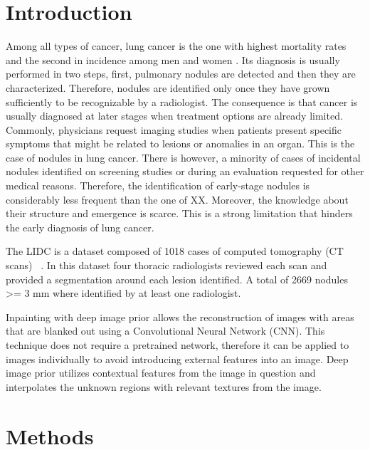 \documentclass[runningheads]{llncs}
\begin{document}
\section{Introduction}

Among all types of cancer, lung cancer is the one with highest mortality rates and the second in incidence among men and women \cite{doi:10.3322/caac.21551}. Its diagnosis is usually performed in two steps, first, pulmonary nodules are detected and then they are characterized. Therefore, nodules are identified only once they have grown sufficiently to be recognizable by a radiologist. The consequence is that cancer is usually diagnosed at later stages when treatment options are already limited.
Commonly, physicians request imaging studies when patients present specific symptoms that might be related to lesions or anomalies in an organ. This is the case of nodules in lung cancer. There is however, a minority of cases of incidental nodules identified on screening studies or during an evaluation requested for other medical reasons. Therefore, the identification of early-stage nodules is considerably less frequent than the one of XX. Moreover, the knowledge about their structure and emergence is scarce. This is a strong limitation that hinders the early diagnosis of lung cancer.

The LIDC is a dataset composed of 1018 cases of computed tomography (CT scans) ~\cite{pmid21452728}. In this dataset four thoracic radiologists reviewed each scan and provided a segmentation around each lesion identified. A total of 2669 nodules >= 3 mm where identified by at least one radiologist. 

Inpainting with deep image prior allows the reconstruction of images with areas that are blanked out using a Convolutional Neural Network (CNN). This technique does not require a pretrained network, therefore it can be applied to images individually to avoid introducing external features into an image. Deep image prior utilizes contextual features from the image in question and interpolates the unknown regions with relevant textures from the image\cite{DBLP:journals/corr/abs-1711-10925}. 

\section{Methods}
\end{document}
